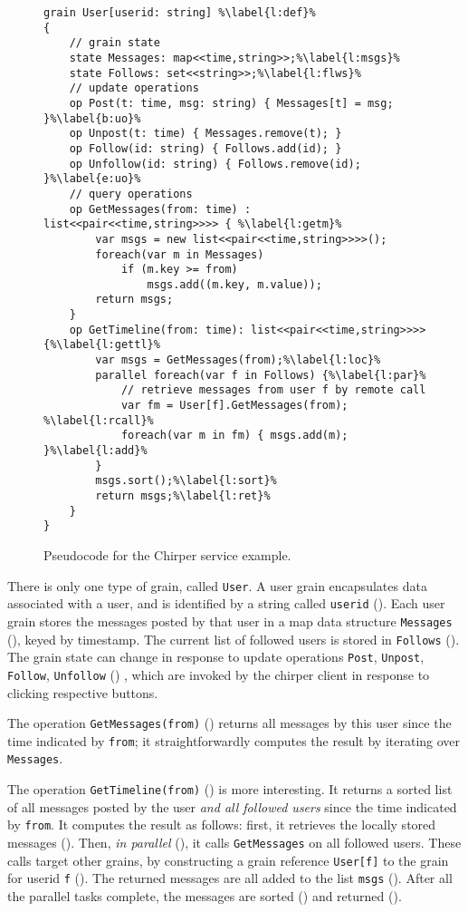 \begin{figure}
\begin{lstlisting}
grain User[userid: string] %\label{l:def}%
{
	// grain state
	state Messages: map<<time,string>>;%\label{l:msgs}%
	state Follows: set<<string>>;%\label{l:flws}%
	// update operations
	op Post(t: time, msg: string) { Messages[t] = msg; }%\label{b:uo}%
	op Unpost(t: time) { Messages.remove(t); }
	op Follow(id: string) { Follows.add(id); }
	op Unfollow(id: string) { Follows.remove(id); }%\label{e:uo}%
	// query operations
	op GetMessages(from: time) : list<<pair<<time,string>>>> { %\label{l:getm}%
		var msgs = new list<<pair<<time,string>>>>();
		foreach(var m in Messages)
			if (m.key >= from)
				msgs.add((m.key, m.value));
		return msgs;
	}
	op GetTimeline(from: time): list<<pair<<time,string>>>> {%\label{l:gettl}%
		var msgs = GetMessages(from);%\label{l:loc}%
		parallel foreach(var f in Follows) {%\label{l:par}%
			// retrieve messages from user f by remote call
			var fm = User[f].GetMessages(from); %\label{l:rcall}%
			foreach(var m in fm) { msgs.add(m); }%\label{l:add}%
		}
		msgs.sort();%\label{l:sort}%
		return msgs;%\label{l:ret}%
	}
}
\end{lstlisting}
\caption{Pseudocode for the Chirper service example.}\label{fig:chirper}
\end{figure}

There is only one type of grain, called \lstinline|User|.  A user grain encapsulates data associated with a user, and is identified by a string called \lstinline{userid} (). Each user grain stores the messages posted by that user in a map data structure \lstinline|Messages| (), keyed by timestamp. The current list of followed users is stored in \lstinline|Follows| (). The grain state can change in response to update operations \lstinline|Post|, \lstinline|Unpost|, \lstinline|Follow|, \lstinline|Unfollow| () , which are invoked by the chirper client in response to clicking respective buttons.

The operation \lstinline|GetMessages(from)| () returns all messages by this user since the time indicated by \lstinline|from|; it straightforwardly computes the result by iterating over \lstinline{Messages}.  

The operation  \lstinline|GetTimeline(from)|  () is more interesting. It returns a sorted list of all messages posted by the user \emph{and all followed users} since  the time indicated by \lstinline|from|. It computes the result as follows: first, it retrieves the locally stored messages (). Then, \emph{in parallel} (), it calls \lstinline|GetMessages| on all followed users. These calls target other grains, by constructing a grain reference \lstinline|User[f]| to the grain for userid \lstinline|f| (). The returned messages are all added to the list \lstinline|msgs| (). After all the parallel tasks complete, the messages are sorted () and returned ().

